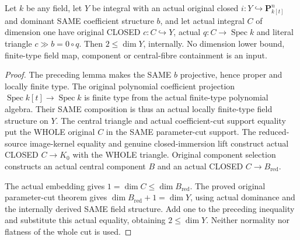 \begin{lemma}
\label{lem:pl-gauss-original-central-curve-whole-dimension-two-le}
\leanok
Let $k$ be any field, let $Y$ be integral with an actual original
closed $i:Y\hookrightarrow\mathbf P^n_{k[t]}$ and dominant SAME
coefficient structure $b$, and let actual integral $C$ of dimension
one have original CLOSED $c:C\hookrightarrow Y$, actual
$q:C\to\operatorname{Spec}k$ and literal triangle $c\gg b=0\circ q$.
Then $2\le\dim Y$, internally. No dimension lower bound, finite-type
field map, component or central-fibre containment is an input.
\end{lemma}
\begin{proof}
The preceding lemma makes the SAME $b$ projective, hence proper and
locally finite type. The original polynomial coefficient projection
$\operatorname{Spec}k[t]\to\operatorname{Spec}k$ is finite type from
the actual finite-type polynomial algebra. Their SAME composition
is thus an actual locally finite-type field structure on $Y$.
The central triangle and actual coefficient-cut support equality put
the WHOLE original $C$ in the SAME parameter-cut support. The
reduced-source image-kernel equality and genuine closed-immersion
lift construct actual CLOSED $C\to K_0$ with the WHOLE triangle.
Original component selection constructs an actual central component
$B$ and an actual CLOSED $C\to B_{\mathrm{red}}$.

The actual embedding gives $1=\dim C\le\dim B_{\mathrm{red}}$.
The proved original parameter-cut theorem gives
$\dim B_{\mathrm{red}}+1=\dim Y$, using actual dominance and the
internally derived SAME field structure. Add one to the preceding
inequality and substitute this actual equality, obtaining
$2\le\dim Y$. Neither normality nor flatness of the whole cut is used.
\end{proof}

